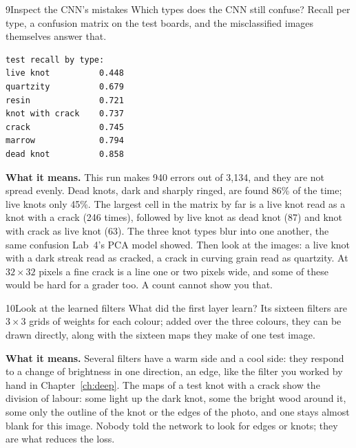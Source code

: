 \begin{labquestion}{9}{Inspect the CNN's mistakes}
Which types does the CNN still confuse? Recall per type, a confusion matrix on the test boards, and the misclassified images themselves answer that.
\end{labquestion}
\begin{labanswer}

\begin{refoutput}
\begin{lstlisting}[style=utpterminal]
test recall by type:
live knot          0.448
quartzity          0.679
resin              0.721
knot with crack    0.737
crack              0.745
marrow             0.794
dead knot          0.858
\end{lstlisting}
\end{refoutput}

\textbf{What it means.} This run makes 940 errors out of 3,134, and they are not spread evenly. Dead knots, dark and sharply ringed, are found 86\% of the time; live knots only 45\%. The largest cell in the matrix by far is a live knot read as a knot with a crack (246 times), followed by live knot as dead knot (87) and knot with crack as live knot (63). The three knot types blur into one another, the same confusion Lab~4's PCA model showed. Then look at the images: a live knot with a dark streak read as cracked, a crack in curving grain read as quartzity. At $32\times32$ pixels a fine crack is a line one or two pixels wide, and some of these would be hard for a grader too. A count cannot show you that.
\end{labanswer}

\begin{labquestion}{10}{Look at the learned filters}
What did the first layer learn? Its sixteen filters are $3\times3$ grids of weights for each colour; added over the three colours, they can be drawn directly, along with the sixteen maps they make of one test image.
\end{labquestion}
\begin{labanswer}


\textbf{What it means.} Several filters have a warm side and a cool side: they respond to a change of brightness in one direction, an edge, like the filter you worked by hand in Chapter~\ref{ch:deep}. The maps of a test knot with a crack show the division of labour: some light up the dark knot, some the bright wood around it, some only the outline of the knot or the edges of the photo, and one stays almost blank for this image. Nobody told the network to look for edges or knots; they are what reduces the loss.
\end{labanswer}

